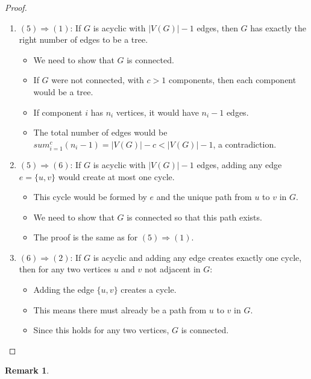 \documentclass{article}
\newtheorem{remark}{Remark}
\theoremstyle{definition}
\def\sum{sum}%
\begin{document}
\begin{proof}
\begin{enumerate}
    \item $(5) \Rightarrow (1)$: If $G$ is acyclic with $|V(G)| - 1$ edges, then $G$ has exactly the right number of edges to be a tree.
    \begin{itemize}
        \item We need to show that $G$ is connected.
        \item If $G$ were not connected, with $c > 1$ components, then each component would be a tree.
        \item If component $i$ has $n_i$ vertices, it would have $n_i - 1$ edges.
        \item The total number of edges would be $\sum_{i=1}^{c} (n_i - 1) = |V(G)| - c < |V(G)| - 1$, a contradiction.
    \end{itemize}
    
    \item $(5) \Rightarrow (6)$: If $G$ is acyclic with $|V(G)| - 1$ edges, adding any edge $e = \{u,v\}$ would create at most one cycle.
    \begin{itemize}
        \item This cycle would be formed by $e$ and the unique path from $u$ to $v$ in $G$.
        \item We need to show that $G$ is connected so that this path exists.
        \item The proof is the same as for $(5) \Rightarrow (1)$.
    \end{itemize}
    
    \item $(6) \Rightarrow (2)$: If $G$ is acyclic and adding any edge creates exactly one cycle, then for any two vertices $u$ and $v$ not adjacent in $G$:
    \begin{itemize}
        \item Adding the edge $\{u,v\}$ creates a cycle.
        \item This means there must already be a path from $u$ to $v$ in $G$.
        \item Since this holds for any two vertices, $G$ is connected.
    \end{itemize}
\end{enumerate}
\end{proof}

\begin{remark}
\end{remark}
\end{document}
